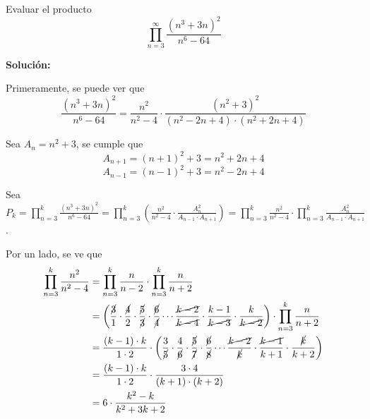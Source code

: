 \documentclass[../../main.tex]{subfiles}
\begin{document}
  \begin{shaded}
    Evaluar el producto
    $$
    \prod_{n = 3}^\infty \frac{(n^3 + 3n)^2}{n^6 - 64}
    $$
  \end{shaded}

  \textbf{Solución:}

  Primeramente, se puede ver que
  $$
  \frac{(n^3 + 3n)^2}{n^6 - 64} = \frac{n^2}{n^2 - 4} \cdot \frac{(n^2 + 3)^2}{(n^2 - 2n + 4) \cdot (n^2 + 2n + 4)}
  $$

  Sea $A_n = n^2 + 3$, se cumple que
  $$
  A_{n + 1} = (n + 1)^2 + 3 = n^2 + 2n + 4
  $$
  $$
  A_{n - 1} = (n - 1)^2 + 3 = n^2 - 2n + 4
  $$

  Sea $P_k = \displaystyle\prod_{n = 3}^k \displaystyle\frac{(n^3 + 3n)^2}{n^6 - 64} = \displaystyle\prod_{n = 3}^k \left(\displaystyle\frac{n^2}{n^2 - 4} \cdot \displaystyle\frac{A_n^2}{A_{n - 1} \cdot A_{n + 1}}\right) = \displaystyle\prod_{n = 3}^k \displaystyle\frac{n^2}{n^2 - 4} \cdot \displaystyle\prod_{n = 3}^k \displaystyle\frac{A_n^2}{A_{n - 1} \cdot A_{n + 1}}$.

  Por un lado, se ve que
  \begin{equation*}
    \begin{split}
      \prod_{n = 3}^k \frac{n^2}{n^2 - 4} & =
      \prod_{n = 3}^k \frac{n}{n - 2} \cdot \prod_{n = 3}^k \frac{n}{n + 2} \\ & =
      \left(\frac{\cancel{3}}{1} \cdot \frac{\cancel{4}}{2} \cdot \frac{\cancel{5}}{\cancel{3}} \cdot \frac{\cancel{6}}{\cancel{4}} \cdots \frac{\cancel{k - 2}}{\cancel{k - 4}} \cdot \frac{k - 1}{\cancel{k - 3}} \cdot \frac{k}{\cancel{k - 2}} \right) \cdot \prod_{n = 3}^k \frac{n}{n + 2} \\ & =
      \frac{(k - 1) \cdot k}{1 \cdot 2} \cdot \left(\frac{3}{\cancel{5}} \cdot \frac{4}{\cancel{6}} \cdot \frac{\cancel{5}}{\cancel{7}} \cdot \frac{\cancel{6}}{\cancel{8}} \cdots \frac{\cancel{k - 2}}{\cancel{k}} \cdot \frac{\cancel{k - 1}}{k + 1} \cdot \frac{\cancel{k }}{k + 2} \right) \\ & =
      \frac{(k - 1) \cdot k}{1 \cdot 2} \cdot \frac{3 \cdot 4}{(k + 1) \cdot (k + 2)} \\ & =
      6 \cdot \frac{k^2 - k}{k^2 + 3k + 2}
    \end{split}
  \end{equation*}
\end{document}
